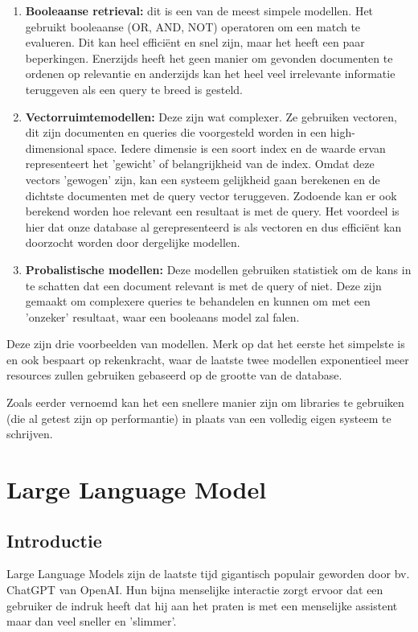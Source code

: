 \begin{enumerate}
	\item \textbf{Booleaanse retrieval:} dit is een van de meest simpele modellen.
	      Het gebruikt booleaanse (OR, AND, NOT) operatoren om een match te evalueren.
	      Dit kan heel efficiënt en snel zijn, maar het heeft een paar beperkingen.
	      Enerzijds heeft het geen manier om gevonden documenten te ordenen op relevantie
	      en anderzijds kan het heel veel irrelevante informatie teruggeven als een query te breed is gesteld.

	\item \textbf{Vectorruimtemodellen:} Deze zijn wat complexer.
	      Ze gebruiken vectoren, dit zijn documenten en queries die voorgesteld worden in een high-dimensional space.
	      Iedere dimensie is een soort index en de waarde ervan representeert het 'gewicht' of belangrijkheid van de index.
	      Omdat deze vectors 'gewogen' zijn, kan een systeem gelijkheid gaan berekenen en de dichtste documenten met de query vector teruggeven.
	      Zodoende kan er ook berekend worden hoe relevant een resultaat is met de query.
	      Het voordeel is hier dat onze database al gerepresenteerd is als vectoren en dus efficiënt kan doorzocht worden door dergelijke modellen.

	\item \textbf{Probalistische modellen: } Deze modellen gebruiken statistiek om de kans in te schatten dat een document relevant is met de query of niet.
	      Deze zijn gemaakt om complexere queries te behandelen en kunnen om met een 'onzeker' resultaat, waar een booleaans model zal falen.
\end{enumerate}

Deze zijn drie voorbeelden van modellen. Merk op dat het eerste het simpelste is en ook bespaart op rekenkracht,
waar de laatste twee modellen exponentieel meer resources zullen gebruiken gebaseerd op de grootte van de database.

Zoals eerder vernoemd kan het een snellere manier zijn om libraries te gebruiken (die al getest zijn op performantie) in plaats van een volledig eigen systeem te schrijven.

\section{Large Language Model}
\subsection{Introductie}
Large Language Models zijn de laatste tijd gigantisch populair geworden door bv. ChatGPT van OpenAI.
Hun bijna menselijke interactie zorgt ervoor dat een gebruiker de indruk heeft dat hij aan het praten is met een menselijke assistent maar dan veel sneller en 'slimmer'.

